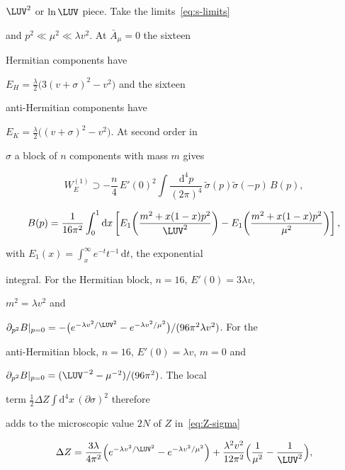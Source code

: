 \(\LUV^2\) or \(\ln\LUV\) piece. Take the limits~\eqref{eq:s-limits}

and \(p^2\ll\mu^2\ll\lambda v^2\). At \(\bar A_\mu=0\) the sixteen

Hermitian components have

\(E_H=\tfrac\lambda2\bigl(3(v+\sigma)^2-v^2\bigr)\) and the sixteen

anti-Hermitian components have

\(E_K=\tfrac\lambda2\bigl((v+\sigma)^2-v^2\bigr)\). At second order in

\(\sigma\) a block of \(n\) components with mass \(m\) gives

\[

  W_E^{(1)}\supset

  -\frac n4\,E'(0)^2\int\frac{\mathrm{d}^4p}{(2\pi)^4}\,

   \tilde\sigma(p)\tilde\sigma(-p)\,B(p),

\]

\[

  B(p)=\frac{1}{16\pi^2}\int_0^1\mathrm{d}x\left[

   E_1\!\left(\frac{m^2+x(1-x)p^2}{\LUV^2}\right)

   -E_1\!\left(\frac{m^2+x(1-x)p^2}{\mu^2}\right)\right],

\]

with \(E_1(x)=\int_x^\infty e^{-t}t^{-1}\,\mathrm dt\), the exponential

integral. For the Hermitian block, \(n=16\), \(E'(0)=3\lambda v\),

\(m^2=\lambda v^2\) and

\(\partial_{p^2}B|_{p=0}=-\bigl(e^{-\lambda v^2/\LUV^2}

-e^{-\lambda v^2/\mu^2}\bigr)/(96\pi^2\lambda v^2)\). For the

anti-Hermitian block, \(n=16\), \(E'(0)=\lambda v\), \(m=0\) and

\(\partial_{p^2}B|_{p=0}=(\LUV^{-2}-\mu^{-2})/(96\pi^2)\). The local

term \(\tfrac12\Delta Z\int\mathrm{d}^4x\,(\partial\sigma)^2\) therefore

adds to the microscopic value \(2N\) of \(Z\) in~\eqref{eq:Z-sigma}

\[

  \Delta Z=\frac{3\lambda}{4\pi^2}

   \Bigl(e^{-\lambda v^2/\LUV^2}-e^{-\lambda v^2/\mu^2}\Bigr)

   +\frac{\lambda^2v^2}{12\pi^2}\Bigl(\frac1{\mu^2}-\frac1{\LUV^2}\Bigr),

\]

